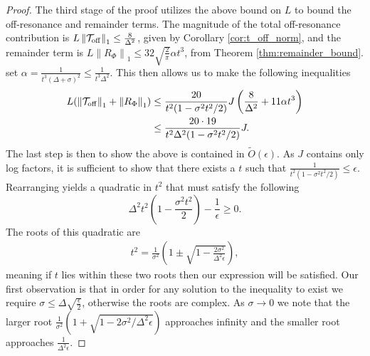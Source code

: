 \documentclass[
 amsmath,amssymb,
 aps,
onecolumn, 
nofootinbib]{revtex4-2}
\newcommand{\off}{\rm off}
\newcommand{\norm}[1]{\left\| #1 \right\|}
\newcommand{\bigotilde}[1]{\widetilde{O} \left( #1 \right)}
\begin{document}
\begin{proof}
 The third stage of the proof utilizes the above bound on $L$ to bound the  off-resonance and remainder terms. The magnitude of the total off-resonance contribution is $L \norm{\mathcal{T}_{\off}}_1 \le \frac{8 }{\Delta^2}$, given by Corollary \ref{cor:t_off_norm}, and the remainder term is $L \norm{R_{\Phi}}_1 \le 32 \sqrt{\frac{2}{\pi}} \alpha t^3$, from Theorem \ref{thm:remainder_bound}. 
 set $\alpha = \frac{1}{t^3(\Delta + \sigma)^2} \le \frac{1}{t^3 \Delta^2}$. This then allows us to make the following inequalities
 \begin{align}
     L(\norm{\mathcal{T}_{\off}}_1 + \norm{R_{\Phi}}_1) &\le \frac{20}{t^2(1 - \sigma^2 t^2 / 2)}J \left( \frac{8}{\Delta^2} + 11 \alpha t^3 \right) \\
    &\le \frac{20 \cdot 19}{t^2 \Delta^2 (1 - \sigma^2 t^2 / 2)}J . \label{eq:single_qubit_tmp_2}
 \end{align}
The last step is then to show the above is contained in $\bigotilde{\epsilon}$. As $J$ contains only log factors, it is sufficient to show that there exists a $t$ such that $\frac{1}{t^2(1 - \sigma^2 t^2 / 2)} \le \epsilon$. Rearranging yields a quadratic in $t^2$ that must satisfy the following
\begin{equation}
    \Delta^2 t^2 \left(1 - \frac{\sigma^2 t^2}{2}\right) - \frac{1}{\epsilon} \ge 0. \label{eq:single_qubit_tmp_3}
\end{equation}
The roots of this quadratic are
\begin{align}
    t^2 = \frac{1}{\sigma^2}\left(1 \pm \sqrt{1 - \frac{2 \sigma^2}{\Delta^2 \epsilon}} \right),
\end{align}
meaning if $t$ lies within these two roots then our expression will be satisfied. Our first observation is that in order for any solution to the inequality to exist we require $\sigma \le \Delta \sqrt{\frac{\epsilon}{2}}$, otherwise the roots are complex. As $\sigma \to 0$ we note that the larger root $\frac{1}{\sigma^2}(1 + \sqrt{1 - 2 \sigma^2 / \Delta^2 \epsilon})$ approaches infinity and the smaller root approaches $\frac{1}{\Delta^2 \epsilon}$.


\end{proof}
\end{document}
